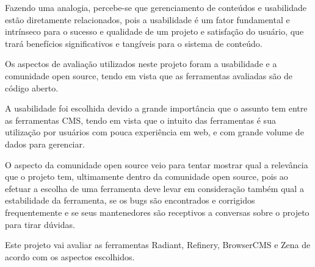 

Fazendo uma analogia, percebe-se  que gerenciamento de conteúdos e usabilidade estão diretamente relacionados, pois a usabilidade é um fator fundamental e intrínseco para o sucesso e qualidade de um projeto e satisfação do usuário, que trará benefícios significativos e tangíveis para o sistema de conteúdo.

Os aspectos de avaliação utilizados neste projeto foram a usabilidade e a comunidade open source, tendo em vista que as ferramentas avaliadas são de código aberto. 

A usabilidade foi escolhida devido a grande importância que o assunto tem entre as ferramentas CMS, tendo em vista que o intuito das ferramentas é sua utilização por usuários com pouca experiência em web, e com grande volume de dados para gerenciar. 

O aspecto da comunidade open source veio para tentar mostrar qual a relevância que o projeto tem, ultimamente dentro da comunidade open source, pois ao efetuar a escolha de uma ferramenta deve  levar em consideração também qual a estabilidade da ferramenta, se os bugs são encontrados e  corrigidos frequentemente e se seus mantenedores são receptivos a conversas sobre o projeto para tirar dúvidas. 

Este projeto vai avaliar as ferramentas Radiant, Refinery, BrowserCMS e Zena de acordo com os aspectos escolhidos.
